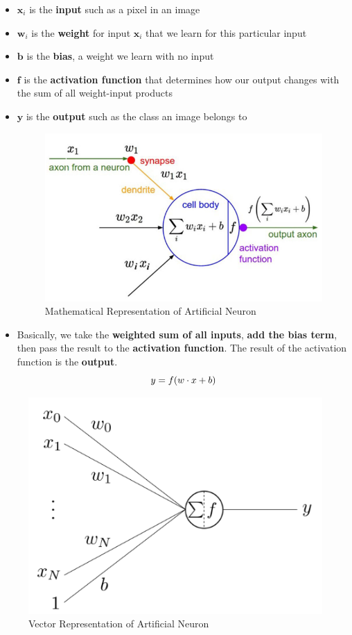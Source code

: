 \begin{itemize}
    \item $\mathbf{x}_i$ is the \textbf{input} such as a pixel in an image
    \item $\mathbf{w}_i$ is the \textbf{weight} for input $\mathbf{x}_i$ that we learn for this particular input
    \item $\mathbf{b}$ is the \textbf{bias}, a weight we learn with no input
    \item $\mathbf{f}$ is the \textbf{activation function} that determines how our output changes with the sum of all weight-input products
    \item $\mathbf{y}$ is the\textbf{ output} such as the class an image belongs to
\begin{figure}[h!t]
    \centering
    \includegraphics[width=0.5\linewidth]{artificialneuron1.png}
    \caption{Mathematical Representation of Artificial Neuron}
    \label{fig:enter-label}
\end{figure}
    \item Basically, we take the \textbf{weighted sum of all inputs}, \textbf{add the bias term}, then pass the result to the \textbf{activation function}. The result of the activation function is the \textbf{output}.
\[ \Huge y = f(w \cdot x + b) \]

\end{itemize}
\begin{figure} [h!t]
    \centering
    \includegraphics[width=0.5\linewidth]{artificialneuron2.png}
    \caption{Vector Representation of Artificial Neuron}
    \label{fig:enter-label}
\end{figure}
